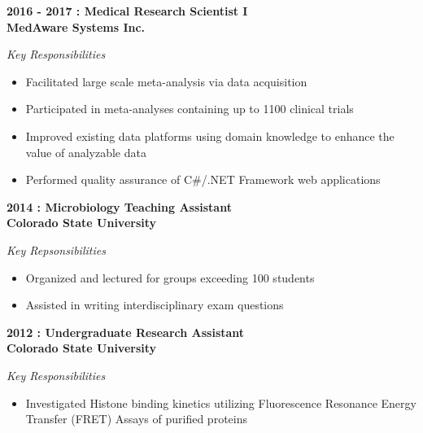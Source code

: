 \documentclass[11pt, a4paper]{awesome-cv}
\providecommand{\tightlist}{%
	\setlength{\itemsep}{0pt}\setlength{\parskip}{0pt}}
\begin{document}
\textbf{2016 - 2017 : Medical Research Scientist I}\\
\textbf{MedAware Systems Inc.}

\emph{Key Responsibilities}

\begin{itemize}
\tightlist
\item
  Facilitated large scale meta-analysis via data acquisition
\item
  Participated in meta-analyses containing up to 1100 clinical trials
\item
  Improved existing data platforms using domain knowledge to enhance the value of analyzable data
\item
  Performed quality assurance of C\#/.NET Framework web applications
\end{itemize}

\textbf{2014 : Microbiology Teaching Assistant}\\
\textbf{Colorado State University}

\emph{Key Repsonsibilities}

\begin{itemize}
\tightlist
\item
  Organized and lectured for groups exceeding 100 students
\item
  Assisted in writing interdisciplinary exam questions
\end{itemize}

\textbf{2012 : Undergraduate Research Assistant }\\
\textbf{Colorado State University}

\emph{Key Responsibilities}

\begin{itemize}
\tightlist
\item
  Investigated Histone binding kinetics utilizing Fluorescence Resonance Energy Transfer (FRET) Assays of purified proteins
\end{itemize}
\end{document}
